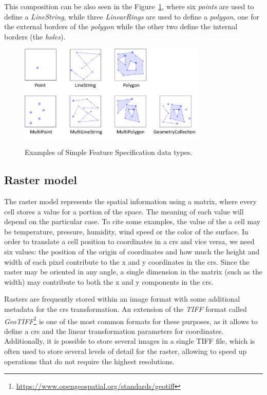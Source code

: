 	This composition can be also seen in the Figure~\ref{fig:gis:sfcexample}, where six \textit{points} are used to define a \textit{LineString}, while three \textit{LinearRings} are used to define a \textit{polygon}, one for the external borders of the \textit{polygon} while the other two define the internal borders (the {\em holes}).
	
	\begin{figure}[ht]
		\begin{center}
			{\includegraphics[width=0.8\textwidth]{figures/sfc_example.png}}
		\end{center}
		\caption{Examples of Simple Feature Specification data types.}
		\label{fig:gis:sfcexample}
	\end{figure}
    
    \subsection{Raster model}
    \label{sec:raster}
    The raster model represents the spatial information using a matrix, where every cell stores a value for a portion of the space. The meaning of each value will depend on the particular case. To cite some examples, the value of the a cell may be temperature, pressure, humidity, wind speed or the color of the surface. In order to translate a cell position to coordinates in a \gls{crs} and vice versa, we need six values: the position of the origin of coordinates and how much the height and width of each pixel contribute to the x and y coordinates in the \gls{crs}. Since the raster may be oriented in any angle, a single dimension in the matrix (such as the width) may contribute to both the x and y components in the \gls{crs}.
    
    Rasters are frequently stored within an image format with some additional metadata for the \gls{crs} transformation. An extension of the {\em TIFF} format called {\em GeoTIFF}\footnote{\url{https://www.opengeospatial.org/standards/geotiff}} is one of the most common formats for these purposes, as it allows to define a \gls{crs} and the linear transformation parameters for coordinates. Additionally, it is possible to store several images in a single TIFF file, which is often used to store several levels of detail for the raster, allowing to speed up operations that do not require the highest resolutions.

